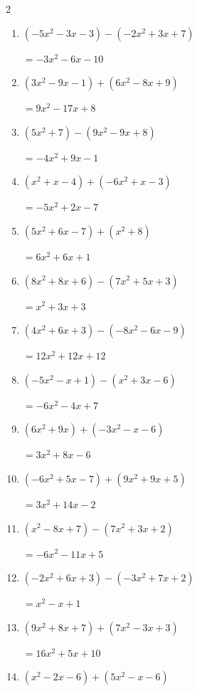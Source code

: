 \begin{multicols}{2}
\begin{enumerate}
  \item $(-5x^{2}-3x-3)-(-2x^{2}+3x+7)$

        $=-3x^{2}-6x-10$

  \item $(3x^{2}-9x-1)+(6x^{2}-8x+9)$

        $=9x^{2}-17x+8$

  \item $(5x^{2}+7)-(9x^{2}-9x+8)$

        $=-4x^{2}+9x-1$

  \item $(x^{2}+x-4)+(-6x^{2}+x-3)$

        $=-5x^{2}+2x-7$

\columnbreak %

\resetques

  \item $(5x^{2}+6x-7)+(x^{2}+8)$

        $=6x^{2}+6x+1$

  \item $(8x^{2}+8x+6)-(7x^{2}+5x+3)$

        $=x^{2}+3x+3$

  \item $(4x^{2}+6x+3)-(-8x^{2}-6x-9)$

        $=12x^{2}+12x+12$

  \item $(-5x^{2}-x+1)-(x^{2}+3x-6)$

        $=-6x^{2}-4x+7$

  \item $(6x^{2}+9x)+(-3x^{2}-x-6)$

        $=3x^{2}+8x-6$

  \item $(-6x^{2}+5x-7)+(9x^{2}+9x+5)$

        $=3x^{2}+14x-2$

  \item $(x^{2}-8x+7)-(7x^{2}+3x+2)$

        $=-6x^{2}-11x+5$

  \item $(-2x^{2}+6x+3)-(-3x^{2}+7x+2)$

        $=x^{2}-x+1$

  \item $(9x^{2}+8x+7)+(7x^{2}-3x+3)$

        $=16x^{2}+5x+10$

  \item $(x^{2}-2x-6)+(5x^{2}-x-6)$


\end{enumerate}
\end{multicols}
